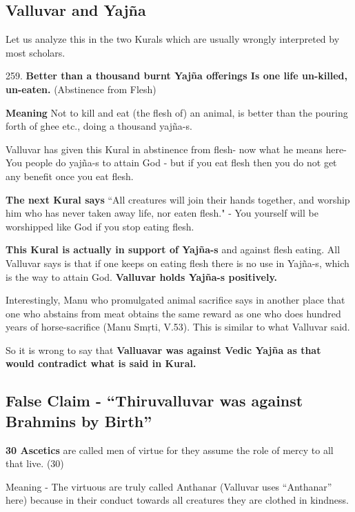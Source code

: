 \subsection*{Valluvar and Yajña}

Let us analyze this in the two Kurals which are usually wrongly interpreted by most scholars.

259. \textbf{Better than a thousand burnt Yajña offerings Is one life un-killed, un-eaten.} (Abstinence from Flesh)

\textbf{Meaning} Not to kill and eat (the flesh of) an animal, is better than the pouring forth of ghee etc., doing a thousand yajña-s.

Valluvar has given this Kural in abstinence from flesh- now what he means here- You people do yajña-s to attain God - but if you eat flesh then you do not get any benefit once you eat flesh.

\textbf{The next Kural says} “All creatures will join their hands together, and worship him who has never taken away life, nor eaten flesh." - You yourself will be worshipped like God if you stop eating flesh.

\textbf{This Kural is actually in support of Yajña-s} and against flesh eating. All Valluvar says is that if one keeps on eating flesh there is no use in Yajña-s, which is the way to attain God. \textbf{Valluvar holds Yajña-s positively.}

Interestingly, Manu who promulgated animal sacrifice says in another place that one who abstains from meat obtains the same reward as one who does hundred years of horse-sacrifice (Manu Smŗti, V.53). This is similar to what Valluvar said.

So it is wrong to say that \textbf{Valluavar was against Vedic Yajña as that would contradict what is said in Kural.}


\subsection*{False Claim - “Thiruvalluvar was against Brahmins by Birth”}

\textbf{30 Ascetics} are called men of virtue for they assume the role of mercy to all that live. (30)

Meaning - The virtuous are truly called Anthanar (Valluvar uses “Anthanar” here) because in their conduct towards all creatures they are clothed in kindness.

